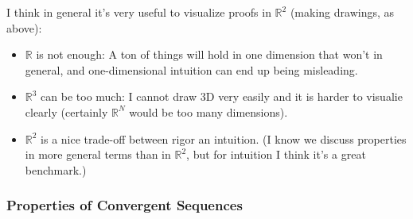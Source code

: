 \documentclass{article}
\begin{document}
\begin{itemize}[label=$\bullet$]
\begin{figure}[H]
    \end{figure}
\end{itemize}

I think in general it's very useful to visualize proofs in $\mathbb{R}^2$ (making drawings, as above):
\begin{itemize}[label=$\bullet$]
  \item $\mathbb{R}$ is not enough: A ton of things will hold in one dimension that won't in general, and one-dimensional intuition can end up being misleading.

  \item $\mathbb{R}^3$ can be too much: I cannot draw 3D very easily and it is harder to visualie clearly (certainly $\mathbb{R}^N$ would be too many dimensions).

  \item $\mathbb{R}^2$ is a nice trade-off between rigor an intuition.  (I know we discuss properties in more general terms than in $\mathbb{R}^2$, but for intuition I think it's a great benchmark.)
\end{itemize}


\subsubsection{Properties of Convergent Sequences}
\label{ssub:properties_of_convergent_sequences}
\end{document}
